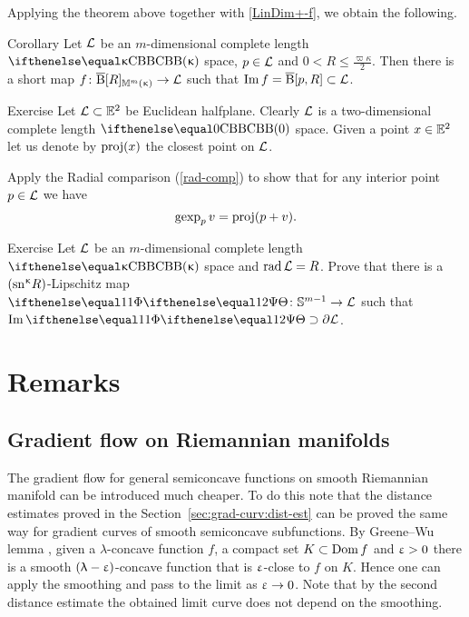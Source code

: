 Applying the theorem above together with \ref{LinDim+-f},
we obtain the following.

{\sloppy 
 
\begin{thm}{Corollary}\label{cor:short-map-to-ball}
Let $\mathcal{L}$ be an $m$-dimensional complete length $\Alex\kappa$ space, $p\in\spc{L}$ and $0<R\le\tfrac{\varpi\kappa}2$.
Then there is a short map 
$f\:\cBall[R]_{\Lob{m}{\kappa}}\to \spc{L}$
such that $\Im f= \cBall[p,R]\subset \spc{L}$.
\end{thm}

}





\begin{thm}{Exercise}\label{ex:gexp} 
Let $\spc{L}\subset\EE^2$ be Euclidean halfplane. 
Clearly $\mathcal{L}$ is a two-dimensional complete length $\Alex{0}$ space.
Given a point $x\in \EE^2$ let us denote by $\mathop{\rm proj}\nolimits(x)$ the closest point on $\mathcal{L}$. 

Apply the Radial comparison (\ref{rad-comp}) to show that for any interior point $p\in \spc{L}$ we have 
\[\mathop{\rm gexp}\nolimits_p v=\mathop{\rm proj}\nolimits(p+v).\]
\end{thm}

{\sloppy 

\begin{thm}{Exercise}\label{ex:bry-cover}
Let $\mathcal{L}$ be an $m$-dimensional complete length $\Alex\kappa$ space and $\mathop{\rm rad}\nolimits\mathcal{L}=R$.
Prove that there is a $(\mathrm{sn}^{\upkappa} R)$-Lipschitz map $\map\:\mathbb{S}^{m-1}\to\spc{L}$ such that $\Im\map\supset\partial\spc{L}$.
\end{thm}

}

\section{Remarks}

\subsection*{Gradient flow on Riemannian manifolds}
The gradient flow for general semiconcave functions 
on smooth Riemannian manifold  can be introduced much cheaper.
To do this note that the distance estimates proved in the Section~\ref{sec:grad-curv:dist-est}
can be proved the same way for gradient curves of smooth semiconcave subfunctions.
By Greene--Wu lemma \cite{greene-wu}, 
given 
a $\lambda$-concave function $f$, 
a compact set $K\subset \Dom f$
and $\upvarepsilon>0$
there is a smooth $(\uplambda-\upvarepsilon)$-concave function that is 
$\upvarepsilon$-close to $f$ on $K$.
Hence one can apply the smoothing and pass to the limit as $\eps\to0$.
Note that by the second distance estimate the obtained limit curve does not depend on the smoothing.

